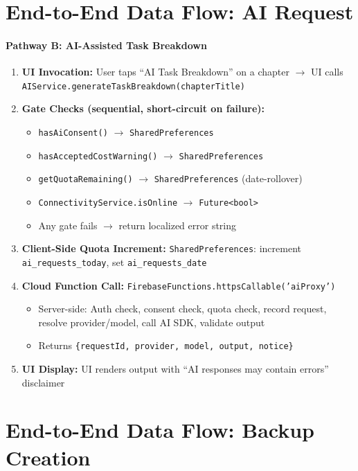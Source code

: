\documentclass[12pt,a4paper,openany]{report}
\begin{document}
\section{End-to-End Data Flow: AI Request}

\paragraph{Pathway B: AI-Assisted Task Breakdown}

\begin{enumerate}[leftmargin=*]
  \item \textbf{UI Invocation:} User taps ``AI Task Breakdown'' on a chapter $\to$ UI calls \texttt{AIService.generateTaskBreakdown(chapterTitle)}
  \item \textbf{Gate Checks (sequential, short-circuit on failure):}
  \begin{itemize}[leftmargin=*]
    \item \texttt{hasAiConsent()} $\to$ \texttt{SharedPreferences}
    \item \texttt{hasAcceptedCostWarning()} $\to$ \texttt{SharedPreferences}
    \item \texttt{getQuotaRemaining()} $\to$ \texttt{SharedPreferences} (date-rollover)
    \item \texttt{ConnectivityService.isOnline} $\to$ \texttt{Future<bool>}
    \item Any gate fails $\to$ return localized error string
  \end{itemize}
  \item \textbf{Client-Side Quota Increment:} \texttt{SharedPreferences}: increment \texttt{ai\_requests\_today}, set \texttt{ai\_requests\_date}
  \item \textbf{Cloud Function Call:} \texttt{FirebaseFunctions.httpsCallable('aiProxy')}
  \begin{itemize}[leftmargin=*]
    \item Server-side: Auth check, consent check, quota check, record request, resolve provider/model, call AI SDK, validate output
    \item Returns \texttt{\{requestId, provider, model, output, notice\}}
  \end{itemize}
  \item \textbf{UI Display:} UI renders output with ``AI responses may contain errors'' disclaimer
\end{enumerate}

\section{End-to-End Data Flow: Backup Creation}
\end{document}
